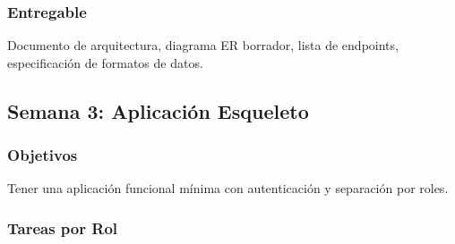 \documentclass[12pt,a4paper]{article}
\begin{document}
\subsubsection{Entregable}
Documento de arquitectura, diagrama ER borrador, lista de endpoints, especificación de formatos de datos.

\subsection{Semana 3: Aplicación Esqueleto}

\subsubsection{Objetivos}
Tener una aplicación funcional mínima con autenticación y separación por roles.

\subsubsection{Tareas por Rol}
\end{document}
